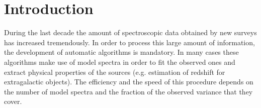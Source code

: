 \documentclass[apj]{emulateapj}
\begin{document}





\section{Introduction}\label{intro}
During the last decade the amount of spectroscopic data obtained by new surveys has increased tremendously. In order to process this large amount of information, the development of automatic algorithms is mandatory. In many cases these algorithms make use of model spectra in order to fit the observed ones and extract physical properties of the sources (e.g. estimation of redshift for extragalactic objects). The efficiency and the speed of this procedure depends on the number of model spectra and the fraction of the observed variance that they cover.
\end{document}
